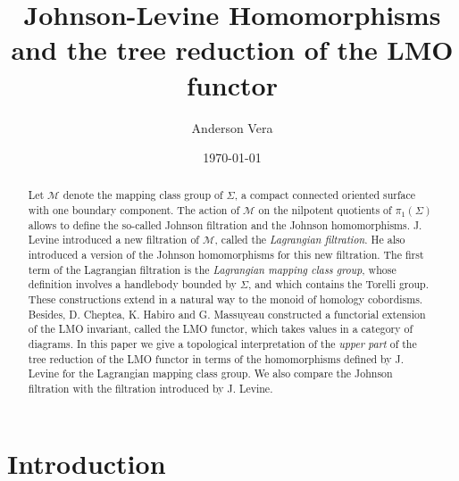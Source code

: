 \documentclass[10pt]{amsart}
\author{Anderson Vera
}
\date{\today}
\title{Johnson-Levine Homomorphisms and the tree reduction of the LMO functor}
\numberwithin{equation}{section}
\numberwithin{equation}{section}
\theoremstyle{definition}
\begin{document}
\begin{abstract}

Let $\mathcal{M}$ denote the mapping class group of $\Sigma$, a compact connected  oriented surface  with one boundary component. The action of $\mathcal{M}$ on the nilpotent quotients of $\pi_1(\Sigma)$ allows to define the so-called  Johnson filtration and  the Johnson homomorphisms. J. Levine introduced a new filtration of $\mathcal{M}$, called the \emph{Lagrangian filtration}. He also introduced  a version of the Johnson homomorphisms for this new filtration. The first term of the Lagrangian filtration is the \emph{Lagrangian mapping class group}, whose definition involves a handlebody bounded by $\Sigma$, and which contains the Torelli group. These constructions extend in a natural way to the monoid of homology cobordisms. Besides, D. Cheptea, K. Habiro and G. Massuyeau  constructed a functorial extension of the LMO invariant, called the LMO functor, which takes values in a category of diagrams. In this paper we give a topological interpretation of the \emph{upper part} of the tree reduction of the LMO functor in terms of the homomorphisms defined by J. Levine for the Lagrangian mapping class group. We also compare the Johnson filtration with the filtration introduced by J. Levine.
\end{abstract}


\maketitle
\tableofcontents

\section{Introduction}%
\end{document}
